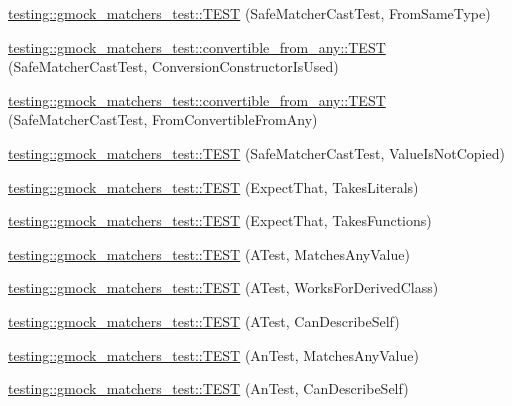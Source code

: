 \begin{DoxyCompactItemize}
\item 
\mbox{\hyperlink{namespacetesting_1_1gmock__matchers__test_a9fc149b429176a45e45267132ae901bd}{testing\+::gmock\+\_\+matchers\+\_\+test\+::\+T\+E\+ST}} (Safe\+Matcher\+Cast\+Test, From\+Same\+Type)
\item 
\mbox{\hyperlink{namespacetesting_1_1gmock__matchers__test_1_1convertible__from__any_aca99c4625c546ea8390dcd2244626a43}{testing\+::gmock\+\_\+matchers\+\_\+test\+::convertible\+\_\+from\+\_\+any\+::\+T\+E\+ST}} (Safe\+Matcher\+Cast\+Test, Conversion\+Constructor\+Is\+Used)
\item 
\mbox{\hyperlink{namespacetesting_1_1gmock__matchers__test_1_1convertible__from__any_a97a2ef4bbe1a2702e4bf79c12b1b9e9a}{testing\+::gmock\+\_\+matchers\+\_\+test\+::convertible\+\_\+from\+\_\+any\+::\+T\+E\+ST}} (Safe\+Matcher\+Cast\+Test, From\+Convertible\+From\+Any)
\item 
\mbox{\hyperlink{namespacetesting_1_1gmock__matchers__test_ac82f8355af7a1e6ba3b67ba8423a1d73}{testing\+::gmock\+\_\+matchers\+\_\+test\+::\+T\+E\+ST}} (Safe\+Matcher\+Cast\+Test, Value\+Is\+Not\+Copied)
\item 
\mbox{\hyperlink{namespacetesting_1_1gmock__matchers__test_a7672c72f955b937542acd87d18dd7ea6}{testing\+::gmock\+\_\+matchers\+\_\+test\+::\+T\+E\+ST}} (Expect\+That, Takes\+Literals)
\item 
\mbox{\hyperlink{namespacetesting_1_1gmock__matchers__test_aafaf5273bd3d8ba273a5dd243d3a52ba}{testing\+::gmock\+\_\+matchers\+\_\+test\+::\+T\+E\+ST}} (Expect\+That, Takes\+Functions)
\item 
\mbox{\hyperlink{namespacetesting_1_1gmock__matchers__test_af15da53cdc65283b8ca688a03801fd12}{testing\+::gmock\+\_\+matchers\+\_\+test\+::\+T\+E\+ST}} (A\+Test, Matches\+Any\+Value)
\item 
\mbox{\hyperlink{namespacetesting_1_1gmock__matchers__test_a2b2dfb85d18883b07f7d13d21abee2fc}{testing\+::gmock\+\_\+matchers\+\_\+test\+::\+T\+E\+ST}} (A\+Test, Works\+For\+Derived\+Class)
\item 
\mbox{\hyperlink{namespacetesting_1_1gmock__matchers__test_a24432bc861bee430fb8ac1a4e5463ecf}{testing\+::gmock\+\_\+matchers\+\_\+test\+::\+T\+E\+ST}} (A\+Test, Can\+Describe\+Self)
\item 
\mbox{\hyperlink{namespacetesting_1_1gmock__matchers__test_a15bf6771986d1e9f675f29861f7551c1}{testing\+::gmock\+\_\+matchers\+\_\+test\+::\+T\+E\+ST}} (An\+Test, Matches\+Any\+Value)
\item 
\mbox{\hyperlink{namespacetesting_1_1gmock__matchers__test_ac3b18688ca5b5cf2d6137ce3e7397691}{testing\+::gmock\+\_\+matchers\+\_\+test\+::\+T\+E\+ST}} (An\+Test, Can\+Describe\+Self)

\end{DoxyCompactItemize}
